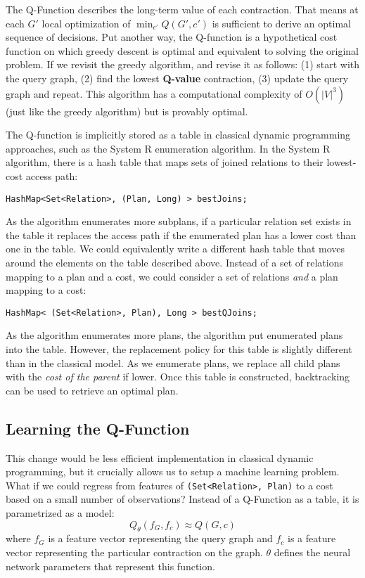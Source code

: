 The Q-Function describes the long-term value of each contraction. 
That means at each $G'$ local optimization of $\min_{c'} Q(G',c')$ is sufficient to derive an optimal sequence of decisions. Put another way, the Q-function is a hypothetical cost function on which greedy descent is optimal and equivalent to solving the original problem.
If we revisit the greedy algorithm, and revise it as follows: (1) start with the query graph, (2) find the lowest \textbf{Q-value} contraction, (3) update the query graph and repeat. This algorithm has a computational complexity of $O(|V|^3)$ (just like the greedy algorithm) but is provably optimal. 

The Q-function is implicitly stored as a table in classical dynamic programming approaches, such as the System R enumeration algorithm. In the System R algorithm, there is a hash table that maps sets of joined relations to their lowest-cost access path:
\begin{lstlisting}
HashMap<Set<Relation>, (Plan, Long) > bestJoins;
\end{lstlisting}
As the algorithm enumerates more subplans, if a particular relation set exists in the table it replaces the access path if the enumerated plan has a lower cost than one in the table. We could equivalently write a different hash table that moves around the elements on the table described above. Instead of a set of relations mapping to a plan and a cost, we could consider a set of relations \emph{and} a plan mapping to a cost: 
\begin{lstlisting}
HashMap< (Set<Relation>, Plan), Long > bestQJoins;
\end{lstlisting}
As the algorithm enumerates more plans, the algorithm put enumerated plans into the table. However, the replacement policy for this table is slightly different than in the classical model. As we enumerate plans, we replace all child plans with the \emph{cost of the parent} if lower. Once this table is constructed, backtracking can be used to retrieve an optimal plan.

\subsection{Learning the Q-Function}
This change would be less efficient implementation in classical dynamic programming, but it crucially allows us to setup a machine learning problem. 
What if we could regress from features of \texttt{(Set<Relation>, Plan)} to a cost based on a small number of observations?
Instead of a Q-Function as a table, it is parametrized as a model:
\[
Q_\theta(f_G,f_c) \approx Q(G,c)
\]
where $f_G$ is a feature vector representing the query graph and $f_c$ is a feature vector representing the particular contraction on the graph. $\theta$ defines the neural network parameters that represent this function. 

